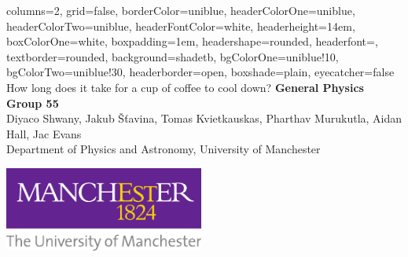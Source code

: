 \documentclass[a0paper,portrait, 3pt]{baposter}
\begin{document}

\begin{poster}{
  columns=2,
	grid=false,
	borderColor=uniblue,
	headerColorOne=uniblue,
	headerColorTwo=uniblue,
	headerFontColor=white,
  headerheight=14em,
	boxColorOne=white,
  boxpadding=1em,
	headershape=rounded,
	headerfont=\Large\textsf,
	textborder=rounded,
	background=shadetb,
  bgColorOne=uniblue!10,
  bgColorTwo=uniblue!30,
	headerborder=open,
  boxshade=plain,
  eyecatcher=false
}
{ %
}
{\vspace{1.25em} 
\smaller How long does it take for a cup of coffee to cool down?}
{
  \vspace{1.5em}
  {  \textbf{General Physics Group 55} \\
	{\smaller Diyaco Shwany, Jakub \v{S}\v{t}avina, Tomas Kvietkauskas, Pharthav Murukutla, Aidan Hall, Jac Evans \\ 
    \textcolor{mcr_purple}{\smaller Department of Physics and Astronomy, University of Manchester}
    }
}
}
{\begin{minipage}{18.0em}
    \includegraphics[height=7.5em]{logo-uni.pdf}
  \end{minipage}}

\end{poster}
\end{document}
